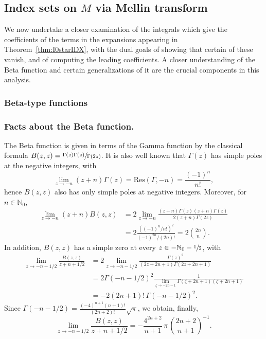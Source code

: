 \documentclass[11pt]{article}
\newcommand{\Subsubsection}{\subsubsection}
\theoremstyle{plain}
\theoremstyle{definition}
\theoremstyle{remark}
\def\Nm{{\mathbb{N}}}
\begin{document}
\subsection{Index sets on $M$ via Mellin transform} \label{sec:MellinBeta}

We now undertake a closer examination of the integrals which give the coefficients of the terms in the expansions appearing in
Theorem~\ref{thm:I0starIDX}, with the dual goals of showing that certain of these vanish, and of computing the leading coefficients.
A closer understanding of the Beta function and certain generalizations of it are the crucial components in this analysis.

\Subsubsection{Beta-type functions}\label{sec:beta}

\subsubsection*{Facts about the Beta function.} The Beta function is given in terms of the Gamma function by the classical formula
$B(z,z) = \sfrac{\Gamma(z)\Gamma(z)}{\Gamma(2z)}$. It is also well known that $\Gamma(z)$ has simple poles at the
negative integers, with
\[
\lim_{z\to -n} (z+n) \Gamma(z) = \mathrm{Res}(\Gamma, -n) = \frac{(-1)^n}{n!},
\]
hence $B(z,z)$ also
has only simple poles at negative integers. Moreover, for $n \in \mathbb N_0$,
\begin{equation}\label{eq:residueB}
\begin{aligned}
\lim_{z\to -n} (z+n) B(z,z) &= 2\lim_{z\to -n} \frac{(z+n) \Gamma(z) (z+n)\Gamma(z)}{2(z+n) \Gamma(2z)}\\
&=2 \frac{((-1)^n/n!)^2}{(-1)^{2n}/ (2n)! } = 2 \binom{2n}{n}.
\end{aligned}
\end{equation}
In addition, $B(z,z)$ has a simple zero at every $z \in -\Nm_0-\sfrac{1}{2}$, with
\begin{align*}
\lim_{z\to -n-1/2} \frac{B(z,z)}{z+n+1/2} &= 2\lim_{z\to -n-1/2} \frac{\Gamma(z)^2}{(2z+2n+1)\Gamma(2z+2n+1)} \\
&= 2\Gamma(-n-1/2)^2 \frac{1}{\lim_{\zeta\to -2n-1} \Gamma(\zeta+2n+1)(\zeta+2n+1)} \\
&= -2 (2n+1) ! \, \Gamma(-n-1/2)^2.
\end{align*}
Since $\Gamma(-n-1/2) = \frac{(-4)^{n+1} (n+1)!}{(2n+2)!} \sqrt{\pi}$, we obtain, finally,
\begin{equation}
\lim_{z\to -n-1/2} \frac{B(z,z)}{z+n+1/2} = -\frac{4^{2n+2}}{n+1} \, \pi \, \binom{2n+2}{n+1}^{-1}.
\label{eq:antiresidue}
\end{equation}
\end{document}

